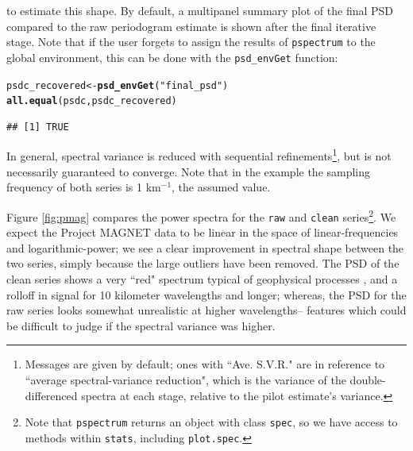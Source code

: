 \documentclass[10pt]{article}\usepackage[]{graphicx}\usepackage[]{color}
\makeatletter
\newcommand{\hlstr}[1]{\textcolor[rgb]{0.192,0.494,0.8}{#1}}%
\newcommand{\hlstd}[1]{\textcolor[rgb]{0.345,0.345,0.345}{#1}}%
\newcommand{\hlkwb}[1]{\textcolor[rgb]{0.69,0.353,0.396}{#1}}%
\newcommand{\hlkwd}[1]{\textcolor[rgb]{0.737,0.353,0.396}{\textbf{#1}}}%
\newenvironment{kframe}{%
 \def\at@end@of@kframe{}%
 \ifinner\ifhmode%
  \def\at@end@of@kframe{\end{minipage}}%
  \begin{minipage}{\columnwidth}%
 \fi\fi%
 \def\FrameCommand##1{\hskip\@totalleftmargin \hskip-\fboxsep
 \colorbox{shadecolor}{##1}\hskip-\fboxsep
     \hskip-\linewidth \hskip-\@totalleftmargin \hskip\columnwidth}%
 \MakeFramed {\advance\hsize-\width
   \@totalleftmargin\z@ \linewidth\hsize
   \@setminipage}}%
 {\par\unskip\endMakeFramed%
 \at@end@of@kframe}
\newenvironment{knitrout}{}{} %
\newcommand{\Rcmd}[1]{\texttt{#1}}
\makeatother
\begin{document}
to estimate this shape.
By default, a multipanel summary plot of the final PSD compared
to the raw periodogram estimate is shown after the final iterative stage.
Note that if the user forgets to assign the results of
\Rcmd{pspectrum} to the global environment, this can be
done with the \Rcmd{psd\_envGet} function:
\begin{knitrout}
\color{fgcolor}\begin{kframe}
\begin{alltt}
\hlstd{psdc_recovered} \hlkwb{<-} \hlkwd{psd_envGet}\hlstd{(}\hlstr{"final_psd"}\hlstd{)}
\hlkwd{all.equal}\hlstd{(psdc, psdc_recovered)}
\end{alltt}
\begin{verbatim}
## [1] TRUE
\end{verbatim}
\end{kframe}
\end{knitrout}

In general, spectral variance is reduced
with sequential refinements\footnote{
Messages are given by default; ones with
``Ave. S.V.R."
are in reference to 
 ``average spectral-variance reduction", which
 is the variance of the
 double-differenced spectra at each stage, relative
 to the pilot estimate's variance.
}, but is not necessarily guaranteed to converge.
Note that in the example
the sampling frequency of both series
is 1 km$^{-1}$, the assumed value.

Figure \ref{fig:pmag} compares the 
power spectra for the \Rcmd{raw} and \Rcmd{clean} 
series\footnote{
Note that \Rcmd{pspectrum} returns
an object with class \Rcmd{spec}, so we have access to methods 
within \Rcmd{stats}, including \Rcmd{plot.spec}.
}.  
We expect the Project MAGNET data to be linear in the space of
linear-frequencies and logarithmic-power;
we see a clear
improvement in spectral shape between the two series,
simply because the large outliers have been removed.
The PSD of the clean series shows a
very ``red" spectrum typical of geophysical processes \citep{agnew1992},
and a rolloff in signal
for 10 kilometer wavelengths and longer; whereas, the 
PSD for the raw series looks somewhat unrealistic at higher wavelengths--
features which could be difficult to judge if the spectral variance was higher.
\end{document}
